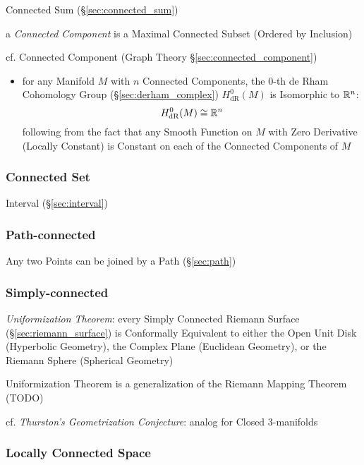 \fist Connected Sum (\S\ref{sec:connected_sum})

a \emph{Connected Component} is a Maximal Connected Subset (Ordered by
Inclusion)

\fist cf. Connected Component (Graph Theory \S\ref{sec:connected_component})

\begin{itemize}
  \item for any Manifold $M$ with $n$ Connected Components, the $0$-th de Rham
    Cohomology Group (\S\ref{sec:derham_complex}) $H_{\mathrm{dR}}^0(M)$ is
    Isomorphic to $\mathbb{R}^n$:
    \[
      H_{\mathrm{dR}}^0(M) \cong \mathbb{R}^n
    \]
    following from the fact that any Smooth Function on $M$ with Zero Derivative
    (Locally Constant) is Constant on each of the Connected Components of $M$
\end{itemize}



\subsubsection{Connected Set}\label{sec:connected_set}

Interval (\S\ref{sec:interval})



\subsubsection{Path-connected}\label{sec:path_connected}

Any two Points can be joined by a Path (\S\ref{sec:path})



\subsubsection{Simply-connected}\label{sec:simply_connected}

\emph{Uniformization Theorem}: every Simply Connected Riemann Surface
(\S\ref{sec:riemann_surface}) is Conformally Equivalent to either the Open Unit
Disk (Hyperbolic Geometry), the Complex Plane (Euclidean Geometry), or the
Riemann Sphere (Spherical Geometry)

Uniformization Theorem is a generalization of the Riemann Mapping Theorem (TODO)

\fist cf. \emph{Thurston's Geometrization Conjecture}: analog for Closed
3-manifolds



\subsubsection{Locally Connected Space}\label{sec:locally_connected}

